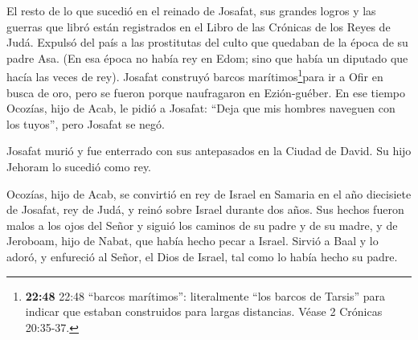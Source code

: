  El resto de lo que sucedió en el reinado de Josafat, sus
grandes logros y las guerras que libró están registrados en el Libro de
las Crónicas de los Reyes de Judá.  Expulsó del país a las
prostitutas del culto que quedaban de la época de su padre Asa.
 (En esa época no había rey en Edom; sino que había un
diputado que hacía las veces de rey).  Josafat construyó
barcos marítimos\footnote{\textbf{22:48} 22:48 ``barcos marítimos'':
  literalmente ``los barcos de Tarsis'' para indicar que estaban
  construidos para largas distancias. Véase 2 Crónicas 20:35-37.}para ir
a Ofir en busca de oro, pero se fueron porque naufragaron en
Ezión-guéber.  En ese tiempo Ocozías, hijo de Acab, le
pidió a Josafat: ``Deja que mis hombres naveguen con los tuyos'', pero
Josafat se negó.

 Josafat murió y fue enterrado con sus antepasados en la
Ciudad de David. Su hijo Jehoram lo sucedió como rey.

 Ocozías, hijo de Acab, se convirtió en rey de Israel en
Samaria en el año diecisiete de Josafat, rey de Judá, y reinó sobre
Israel durante dos años.  Sus hechos fueron malos a los
ojos del Señor y siguió los caminos de su padre y de su madre, y de
Jeroboam, hijo de Nabat, que había hecho pecar a Israel. 
Sirvió a Baal y lo adoró, y enfureció al Señor, el Dios de Israel, tal
como lo había hecho su padre.
